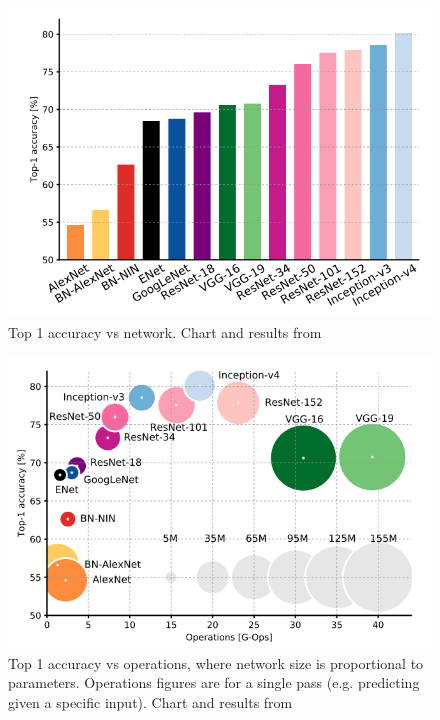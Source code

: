\documentclass[11pt,a4paper]{article}
\begin{document}
        \begin{figure}
            \centering
            \includegraphics[width=.7\linewidth]{Top1AccuracyOverNetwork.png}
            \caption{Top 1 accuracy vs network. Chart and results from \cite{DeepNeuralNetworkDeployability}}
            \label{Top1AccuracyOverNetwork}
        \end{figure}

        \begin{figure}
            \centering
            \includegraphics[width=.7\linewidth]{Top1AccuracyOverOperations.png}
            \caption{Top 1 accuracy vs operations, where network size is proportional to parameters. Operations figures are for a single pass (e.g. predicting given a specific input). Chart and results from \cite{DeepNeuralNetworkDeployability}}
            \label{Top1AccuracyOverOperations}
        \end{figure}
\end{document}
